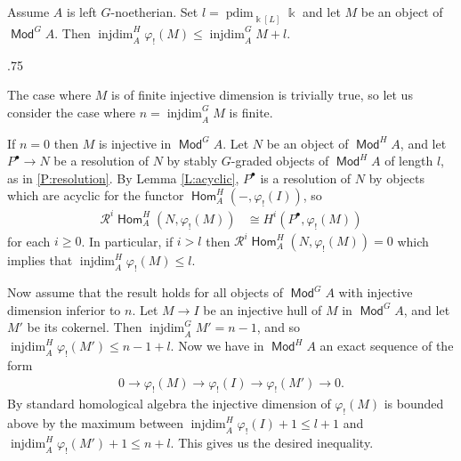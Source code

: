 \documentclass[11pt,fleqn]{article}
\makeatletter
\renewenvironment{proof}[1][\textit{Proof}]{\par
  \pushQED{\qed}%
  \normalfont \topsep.75\paraskip\relax
  \trivlist
  \item[\hskip\labelsep
        \itshape
    #1\@addpunct{.}]\ignorespaces
}{%
  \popQED\endtrivlist\@endpefalse
}
\renewcommand\to{\longrightarrow}
\renewcommand\phi{\varphi}
\renewcommand\k{\Bbbk}
\newcommand\R{\mathcal R}
\DeclareMathOperator\Mod{\mathsf{Mod}}
\DeclareMathOperator\Hom{\mathsf{Hom}}
\DeclareMathOperator\injdim{injdim}
\DeclareMathOperator\projdim{pdim}
\makeatother
\begin{document}
\begin{Theorem}
Assume $A$ is left $G$-noetherian.
Set $l = \projdim_{\k[L]} \k$ and let $M$ be an object of $\Mod^G A$. Then 
$\injdim^H_A \phi_!(M) \leq \injdim^G_A M + l$.
\end{Theorem}
\begin{proof}
The case where $M$ is of finite injective dimension is trivially true, so let
us consider the case where $n = \injdim_A^G M$ is finite. 

If $n = 0$ then $M$ is injective in $\Mod^G A$. Let $N$ be an object of 
$\Mod^H A$, and let $P^\bullet \to N$ be a resolution of $N$ by stably 
$G$-graded objects of $\Mod^H A$ of length $l$, as in \ref{P:resolution}.
By Lemma \ref{L:acyclic}, $P^\bullet$ is a resolution of $N$ by objects which 
are acyclic for the functor $\Hom_A^H(-,\phi_!(I))$, so 
\begin{align*}
\R^i\Hom_A^H(N, \phi_!(M)) 
  &\cong H^i(P^\bullet, \phi_!(M))
\end{align*}
for each $i \geq 0$. In particular, if $i > l$ then $\R^i\Hom_A^H(N, 
\phi_!(M)) = 0$ which implies that $\injdim_A^H \phi_!(M) \leq l$.

Now assume that the result holds for all objects of $\Mod^G A$ with
injective dimension inferior to $n$. Let $M \to I$ be an injective hull
of $M$ in $\Mod^G A$, and let $M'$ be its cokernel. Then $\injdim^G_A M' = 
n-1$, and so $\injdim^H_A \phi_!(M') \leq n-1+l$. Now we have in $\Mod^H A$
an exact sequence of the form
\begin{align*}
0 \to \phi_!(M) \to \phi_!(I) \to \phi_!(M')  \to 0.
\end{align*}
By standard homological algebra the injective dimension of $\phi_!(M)$ is bounded above by the maximum between $\injdim_A^H \phi_!(I) + 1 \leq l+1$ and 
$\injdim_A^H \phi_!(M') + 1 \leq n+l$. This gives us the desired inequality.
\end{proof}
\end{document}
